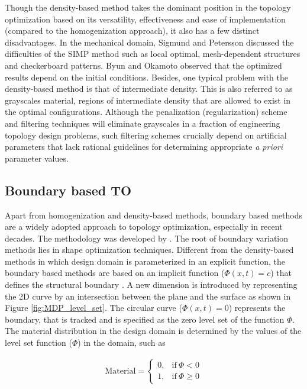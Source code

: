 Though  the  density-based  method  takes  the  dominant  position  in  the  topology optimization based on its versatility, effectiveness and ease of implementation (compared to the homogenization approach), it also has a  few  distinct  disadvantages.  In  the  mechanical  domain,  Sigmund  and  Petersson \parencite{Sigmund1998} discussed  the  difficulties  of  the  SIMP  method  such  as  local  optimal,  mesh-dependent structures  and  checkerboard  patterns.  Byun \parencite{byun2004node} and  Okamoto \parencite{okamoto2006investigation} observed  that  the optimized  results  depend  on  the  initial  conditions.  Besides,  one  typical  problem with the density-based method is that of intermediate  density. This is also referred to as grayscales material, regions of intermediate density that are allowed to exist in the optimal configurations. Although  the  penalization (regularization)  scheme and filtering techniques \parencite{midha2019selection} will  eliminate  grayscales  in  a fraction of engineering topology design problems, such filtering schemes crucially depend  on  artificial  parameters  that  lack  rational  guidelines  for  determining appropriate \textit{a priori} parameter values.

\subsection{Boundary based TO}

Apart  from  homogenization and density-based  methods,  boundary  based  methods  are a widely adopted approach to topology optimization, especially in recent decades. The methodology was developed by \cite{osher1988fronts}. The root of  boundary  variation methods  lies  in  shape  optimization  techniques.  Different  from  the density-based  methods  in  which  design  domain  is  parameterized  in  an  explicit  function,  the boundary based methods are based on an implicit function  ($\Phi(x,t) = c$) that defines the structural boundary \parencite{deaton2014survey}. A new dimension is introduced by representing the 2D curve by an intersection between the plane and the surface as shown in Figure \ref{fig:MDP_level_set}. The circular curve ($\Phi(x,t) = 0$) represents the boundary, that is tracked and is specified as the zero level set of the function $\Phi$. The material distribution in the design domain is determined by the values of the level set function ($\Phi$) in the domain, such as 

\begin{align}
    \text{Material}=
    \begin{cases}
      0, & \text{if}\ \Phi < 0 \\
      1, & \text{if}\ \Phi \geq 0
    \end{cases}
\end{align}

